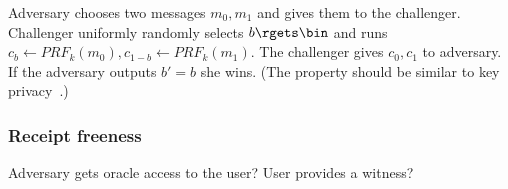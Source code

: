 \begin{definition}
  Adversary chooses two messages \(m_0, m_1\) and gives them to the challenger.
  Challenger uniformly randomly selects \(b\rgets \bin\) and runs \(c_b \gets 
    PRF_k(m_0), c_{1-b} \gets PRF_k(m_1)\).
  The challenger gives \(c_0, c_1\) to adversary.
  If the adversary outputs \(b' = b\) she wins.
  (The property should be similar to key privacy~\cite{KeyPrivacy}.)
\end{definition}

\subsubsection{Receipt freeness}

\begin{definition}
  Adversary gets oracle access to the user?
  User provides a witness?
\end{definition}

